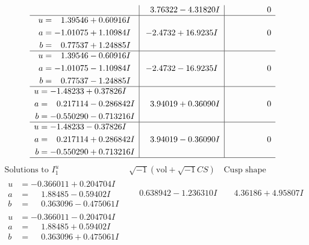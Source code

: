 \documentclass[1p]{elsarticle_modified}
\theoremstyle{definition}
\newcommand{\I}{\sqrt{-1}}
\begin{document}
$$\begin{array}{c|c|c}
 & \phantom{-}3.76322 - 4.31820 I & \phantom{-0.000000 } 0 \\ \hline\begin{aligned}
u &= \phantom{-}1.39546 + 0.60916 I \\
a &= -1.01075 + 1.10984 I \\
b &= \phantom{-}0.77537 + 1.24885 I\end{aligned}
 & -2.4732 + 16.9235 I & \phantom{-0.000000 } 0 \\ \hline\begin{aligned}
u &= \phantom{-}1.39546 - 0.60916 I \\
a &= -1.01075 - 1.10984 I \\
b &= \phantom{-}0.77537 - 1.24885 I\end{aligned}
 & -2.4732 - 16.9235 I & \phantom{-0.000000 } 0 \\ \hline\begin{aligned}
u &= -1.48233 + 0.37826 I \\
a &= \phantom{-}0.217114 - 0.286842 I \\
b &= -0.550290 - 0.713216 I\end{aligned}
 & \phantom{-}3.94019 + 0.36090 I & \phantom{-0.000000 } 0 \\ \hline\begin{aligned}
u &= -1.48233 - 0.37826 I \\
a &= \phantom{-}0.217114 + 0.286842 I \\
b &= -0.550290 + 0.713216 I\end{aligned}
 & \phantom{-}3.94019 - 0.36090 I & \phantom{-0.000000 } 0\\
 \hline 
 \end{array}$$\newpage$$\begin{array}{c|c|c}  
\text{Solutions to }I^u_{1}& \I (\text{vol} + \sqrt{-1}CS) & \text{Cusp shape}\\
 \hline 
\begin{aligned}
u &= -0.366011 + 0.204704 I \\
a &= \phantom{-}1.88485 - 0.59402 I \\
b &= \phantom{-}0.363096 - 0.475061 I\end{aligned}
 & \phantom{-}0.638942 - 1.236310 I & \phantom{-}4.36186 + 4.95807 I \\ \hline\begin{aligned}
u &= -0.366011 - 0.204704 I \\
a &= \phantom{-}1.88485 + 0.59402 I \\
b &= \phantom{-}0.363096 + 0.475061 I\end{aligned}

\end{array}$$
\end{document}
